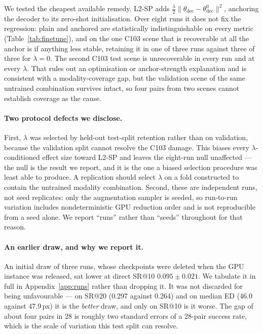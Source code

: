 \documentclass[10pt]{article}
\begin{document}
We tested the cheapest available remedy. L2-SP \citep{li2018l2sp} adds $\tfrac{\lambda}{2}\lVert\theta_{\mathrm{dec}}-\theta_{\mathrm{dec}}^{0}\rVert^{2}$, anchoring the decoder to its zero-shot initialisation. Over eight runs it does not fix the regression: plain and anchored are statistically indistinguishable on every metric (Table~\ref{tab:finetune}), and on the one C103 scene that is recoverable at all the anchor is if anything less stable, retaining it in one of three runs against three of three for $\lambda=0$. The second C103 test scene is unrecoverable in every run and at every $\lambda$. That rules out an optimisation or anchor-strength explanation and is consistent with a modality-coverage gap, but the validation scene of the same untrained combination survives intact, so four pairs from two scenes cannot establish coverage as the cause.

\paragraph{Two protocol defects we disclose.} First, $\lambda$ was selected by held-out test-split retention rather than on validation, because the validation split cannot resolve the C103 damage. This biases every $\lambda$-conditioned effect size toward L2-SP and leaves the eight-run null unaffected --- the null is the result we report, and it is the one a biased selection procedure was least able to produce. A replication should select $\lambda$ on a fold constructed to contain the untrained modality combination. Second, these are independent runs, not seed replicates: only the augmentation sampler is seeded, so run-to-run variation includes nondeterministic GPU reduction order and is not reproducible from a seed alone. We report ``runs'' rather than ``seeds'' throughout for that reason.

\paragraph{An earlier draw, and why we report it.} An initial draw of three runs, whose checkpoints were deleted when the GPU instance was released, sat lower at direct SR@10 $0.095\pm0.021$. We tabulate it in full in Appendix~\ref{app:runs} rather than dropping it. It was not discarded for being unfavourable --- on SR@20 (0.297 against 0.264) and on median ED (46.0 against 47.9\,px) it is the \emph{better} draw, and only on SR@10 is it worse. The gap of about four pairs in 28 is roughly two standard errors of a 28-pair success rate, which is the scale of variation this test split can resolve.
\end{document}
